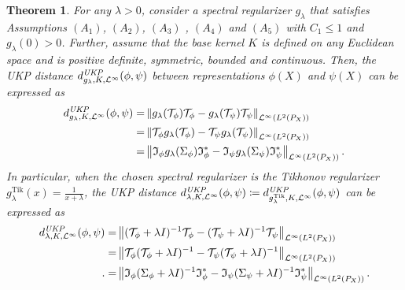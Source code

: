\documentclass{article} %
\newcommand{\I}{\mathfrak{I}}
\newcommand{\repone}{\phi}
\newcommand{\reptwo}{\psi}
\newcommand{\Sone}{\Sigma_{\repone}}
\newcommand{\Stwo}{\Sigma_{\reptwo}}
\newcommand{\Sonelambdainv}{(\Sone+\lambda I)^{-1}}
\newcommand{\Stwolambdainv}{(\Stwo+\lambda I)^{-1}}
\newcommand{\Tone}{\mathcal{T}_{\repone}}
\newcommand{\Ttwo}{\mathcal{T}_{\reptwo}}
\newcommand{\Tonelambdainv}{(\Tone+\lambda I)^{-1}}
\newcommand{\Ttwolambdainv}{(\Ttwo+\lambda I)^{-1}}
\newcommand{\Irepone}{\I_{\repone}}
\newcommand{\Ireptwo}{\I_{\reptwo}}
\newcommand{\Ireponead}{\Irepone^{*}}
\newcommand{\Ireptwoad}{\Ireptwo^{*}}
\newcommand{\gl}{g_{\lambda}}
\newcommand{\glTik}{\gl^{\operatorname{Tik}}}
\newcommand{\norm}[1]{\left\|#1\right\|}
\newcommand{\LPtwo}{L^{2}(P_{X})}
\newcommand{\optwo}{\mathcal{L}^{\infty}(\LPtwo)}
\newcommand{\metricstname}{UKP }
\newcommand{\dop}{d_{\lambda,K,\mathcal{L}^{\infty}}^{\emph{\metricstname}}}
\newcommand{\dopgl}{d_{\gl,K,\mathcal{L}^{\infty}}^{\emph{\metricstname}}}
\newcommand{\dopglTik}{d_{\glTik,K,\mathcal{L}^{\infty}}^{\emph{\metricstname}}}
\newcommand{\SpectralAssumptionone}{A_{1}}
\newcommand{\SpectralAssumptiontwo}{A_{2}}
\newcommand{\SpectralAssumptionthree}{A_{3}}
\newcommand{\SpectralAssumptionfour}{A_{4}}
\newcommand{\SpectralAssumptionfive}{A_{5}}
\theoremstyle{plain}
\newcounter{theoremno}
\newtheorem{theorem}[theoremno]{Theorem}
\begin{document}
\begin{theorem}\label{Characterization of pseudometric in terms of operator norm}
For any $\lambda>0$, consider a spectral regularizer $\gl$ that satisfies Assumptions \hyperref[Assumption Spectral Regularizer A1]{$(\SpectralAssumptionone)$}, \hyperref[Assumption Spectral Regularizer A2]{$(\SpectralAssumptiontwo)$}, \hyperref[Assumption Spectral Regularizer A3]{$(\SpectralAssumptionthree)$} , \hyperref[Assumption Spectral Regularizer A4]{$(\SpectralAssumptionfour)$} and \hyperref[Assumption Spectral Regularizer A5]{$(\SpectralAssumptionfive)$} with $C_1 \leq 1$ and $\gl(0)>0$. Further, assume that the base kernel $K$ is defined on any Euclidean space and is positive definite, symmetric, bounded and continuous. Then, the \metricstname distance $\dopgl(\repone,\reptwo)$ between representations $\repone(X)$ and $\reptwo(X)$ can be expressed as 
\[
\begin{aligned}
     \dopgl(\repone,\reptwo) =& \norm{\gl(\Tone) \Tone - \gl(\Ttwo) \Ttwo}_{\optwo} \\
     =& \norm{ \Tone \gl(\Tone) -  \Ttwo \gl(\Ttwo)}_{\optwo} \\
     =& \norm{ \Irepone \gl(\Sone) \Ireponead -  \Ireptwo \gl(\Stwo) \Ireptwoad }_{\optwo}.
\end{aligned}
\]
In particular, when the chosen spectral regularizer is the Tikhonov regularizer $\glTik(x) = \frac{1}{x+\lambda}$, the UKP distance $ \dop (\repone,\reptwo) \coloneqq  \dopglTik(\repone,\reptwo)$ can be expressed as
\[
\begin{aligned}
     \dop(\repone,\reptwo) =& \norm{\Tonelambdainv \Tone - \Ttwolambdainv \Ttwo}_{\optwo}\\
     =&\norm{\Tone \Tonelambdainv  - \Ttwo \Ttwolambdainv }_{\optwo}\\.
     =& \norm{ \Irepone \Sonelambdainv \Ireponead -  \Ireptwo \Stwolambdainv \Ireptwoad }_{\optwo}.
\end{aligned}
\]
\end{theorem}
\end{document}
